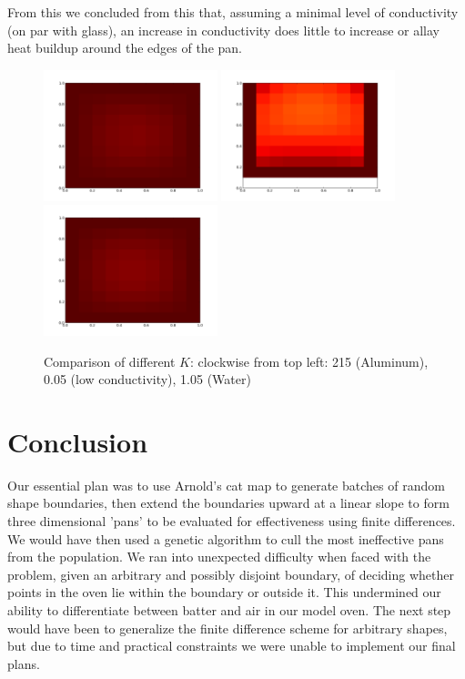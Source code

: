 \documentclass[12pt]{reedmcm}
\begin{document}
From this we concluded from this that, assuming a minimal level of conductivity (on par with glass), an increase in conductivity does little to increase or allay heat buildup around the edges of the pan.\\
\begin{figure}[t]
  \centering
  \includegraphics[width=0.45\textwidth]{aluminum_plot}
  \hspace{1cm}
  \includegraphics[width=0.45\textwidth]{lowcon_plot}
  \includegraphics[width=0.45\textwidth]{watercon_plot}
  \caption{Comparison of different $K$: clockwise from top left: 215 (Aluminum), 0.05 (low conductivity), 1.05 (Water)}
  \label{fig:conductivity}
\end{figure}
%



\section{Conclusion}
Our essential plan was to use Arnold's cat map to generate batches of random shape boundaries, then extend the boundaries upward at a linear slope to form three dimensional 'pans' to be evaluated for effectiveness using finite differences.  We would have then used a genetic algorithm to cull the most ineffective pans from the population.  We ran into unexpected difficulty when faced with the problem, given an arbitrary and possibly disjoint boundary, of deciding whether points in the oven lie within the boundary or outside it.  This undermined our ability to differentiate between batter and air in our model oven.  The next step would have been to generalize the finite difference scheme for arbitrary shapes, but due to time and practical constraints we were unable to implement our final plans. 
\end{document}
